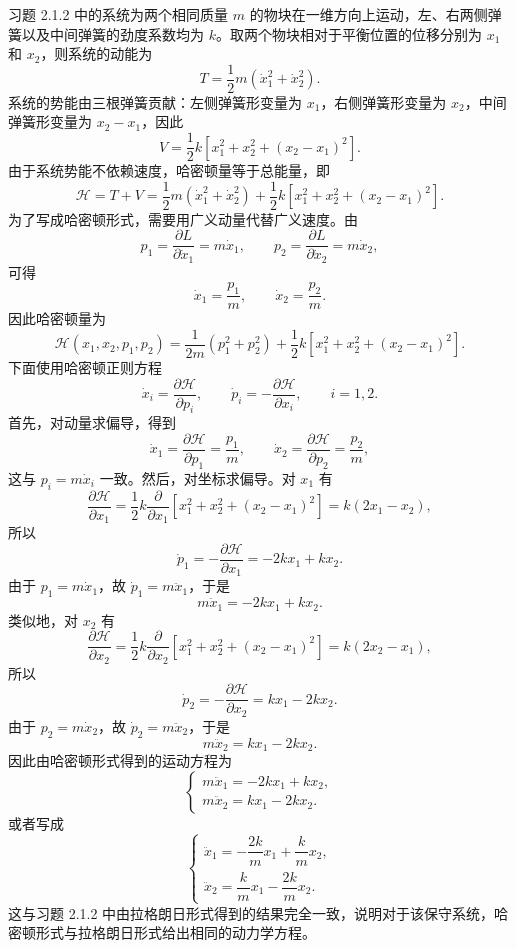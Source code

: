 \begin{solution}[耦合质量问题的哈密顿形式]
\answer
习题 2.1.2 中的系统为两个相同质量 \(m\) 的物块在一维方向上运动，左、右两侧弹簧以及中间弹簧的劲度系数均为 \(k\)。取两个物块相对于平衡位置的位移分别为 \(x_1\) 和 \(x_2\)，则系统的动能为
\[
T=\frac{1}{2}m(\dot{x}_1^2+\dot{x}_2^2).
\]
系统的势能由三根弹簧贡献：左侧弹簧形变量为 \(x_1\)，右侧弹簧形变量为 \(x_2\)，中间弹簧形变量为 \(x_2-x_1\)，因此
\[
V=\frac{1}{2}k\left[x_1^2+x_2^2+(x_2-x_1)^2\right].
\]
由于系统势能不依赖速度，哈密顿量等于总能量，即
\[
\mathcal H=T+V
=\frac{1}{2}m(\dot{x}_1^2+\dot{x}_2^2)
+\frac{1}{2}k\left[x_1^2+x_2^2+(x_2-x_1)^2\right].
\]
为了写成哈密顿形式，需要用广义动量代替广义速度。由
\[
p_1=\frac{\partial L}{\partial \dot{x}_1}=m\dot{x}_1,\qquad
p_2=\frac{\partial L}{\partial \dot{x}_2}=m\dot{x}_2,
\]
可得
\[
\dot{x}_1=\frac{p_1}{m},\qquad \dot{x}_2=\frac{p_2}{m}.
\]
因此哈密顿量为
\[
\mathcal H(x_1,x_2,p_1,p_2)
=
\frac{1}{2m}(p_1^2+p_2^2)
+\frac{1}{2}k\left[x_1^2+x_2^2+(x_2-x_1)^2\right].
\]
下面使用哈密顿正则方程
\[
\dot{x}_i=\frac{\partial \mathcal H}{\partial p_i},\qquad
\dot{p}_i=-\frac{\partial \mathcal H}{\partial x_i},\qquad i=1,2.
\]
首先，对动量求偏导，得到
\[
\dot{x}_1=\frac{\partial \mathcal H}{\partial p_1}=\frac{p_1}{m},\qquad
\dot{x}_2=\frac{\partial \mathcal H}{\partial p_2}=\frac{p_2}{m},
\]
这与 \(p_i=m\dot{x}_i\) 一致。然后，对坐标求偏导。对 \(x_1\) 有
\[
\frac{\partial \mathcal H}{\partial x_1}
=
\frac{1}{2}k\frac{\partial}{\partial x_1}\left[x_1^2+x_2^2+(x_2-x_1)^2\right]
=
k(2x_1-x_2),
\]
所以
\[
\dot{p}_1=-\frac{\partial \mathcal H}{\partial x_1}
=-2kx_1+kx_2.
\]
由于 \(p_1=m\dot{x}_1\)，故 \(\dot{p}_1=m\ddot{x}_1\)，于是
\[
m\ddot{x}_1=-2kx_1+kx_2.
\]
类似地，对 \(x_2\) 有
\[
\frac{\partial \mathcal H}{\partial x_2}
=
\frac{1}{2}k\frac{\partial}{\partial x_2}\left[x_1^2+x_2^2+(x_2-x_1)^2\right]
=
k(2x_2-x_1),
\]
所以
\[
\dot{p}_2=-\frac{\partial \mathcal H}{\partial x_2}
=kx_1-2kx_2.
\]
由于 \(p_2=m\dot{x}_2\)，故 \(\dot{p}_2=m\ddot{x}_2\)，于是
\[
m\ddot{x}_2=kx_1-2kx_2.
\]
因此由哈密顿形式得到的运动方程为
\[
\begin{cases}
m\ddot{x}_1=-2kx_1+kx_2,\\[4pt]
m\ddot{x}_2=kx_1-2kx_2.
\end{cases}
\]
或者写成
\[
\begin{cases}
\ddot{x}_1=-\dfrac{2k}{m}x_1+\dfrac{k}{m}x_2,\\[6pt]
\ddot{x}_2=\dfrac{k}{m}x_1-\dfrac{2k}{m}x_2.
\end{cases}
\]
这与习题 2.1.2 中由拉格朗日形式得到的结果完全一致，说明对于该保守系统，哈密顿形式与拉格朗日形式给出相同的动力学方程。
\end{solution}


